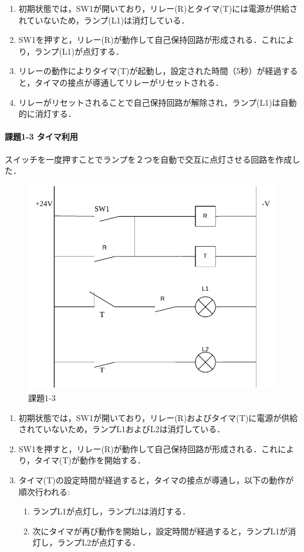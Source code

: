 \begin{enumerate}
  \item 初期状態では，SW1が開いており，リレー(R)とタイマ(T)には電源が供給されていないため，ランプ(L1)は消灯している．
  \item SW1を押すと，リレー(R)が動作して自己保持回路が形成される．これにより，ランプ(L1)が点灯する．
  \item リレーの動作によりタイマ(T)が起動し，設定された時間（5秒）が経過すると，タイマの接点が導通してリレーがリセットされる．
  \item リレーがリセットされることで自己保持回路が解除され，ランプ(L1)は自動的に消灯する．
\end{enumerate}


\paragraph{課題1-3 タイマ利用}
スイッチを一度押すことでランプを２つを自動で交互に点灯させる回路を作成した．
\begin{figure}[H]
  \centering
  \includegraphics[scale=0.5]{sozai/16.pdf}
  \caption{課題1-3}
\end{figure}

\begin{enumerate}
  \item 初期状態では，SW1が開いており，リレー(R)およびタイマ(T)に電源が供給されていないため，ランプL1およびL2は消灯している．
  \item SW1を押すと，リレー(R)が動作して自己保持回路が形成される．これにより，タイマ(T)が動作を開始する．
  \item タイマ(T)の設定時間が経過すると，タイマの接点が導通し，以下の動作が順次行われる:
  \begin{enumerate}
      \item ランプL1が点灯し，ランプL2は消灯する．
      \item 次にタイマが再び動作を開始し，設定時間が経過すると，ランプL1が消灯し，ランプL2が点灯する．
  \end{enumerate}
\end{enumerate}


